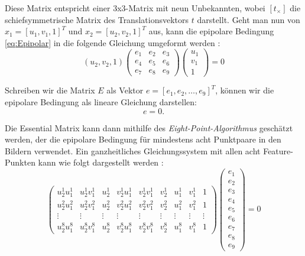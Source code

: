 Diese Matrix entspricht einer 3x3-Matrix mit neun Unbekannten, wobei \( [t_{\times}] \) die schiefsymmetrische Matrix des Translationsvektors \( t \) darstellt. Geht man nun von \( x_1 = [u_1, v_1, 1]^T \) und \( x_2 = [u_2, v_2, 1]^T \) aus, kann die epipolare Bedingung \ref{eq:Epipolar} in die folgende Gleichung umgeformt werden \cite{gao2021vSLAM}:
\begin{equation}
(u_2, v_2, 1) 
\begin{pmatrix}
    e_1 & e_2 & e_3 \\
    e_4 & e_5 & e_6 \\
    e_7 & e_8 & e_9
\end{pmatrix}
\begin{pmatrix}
    u_1 \\ v_1 \\ 1
\end{pmatrix}
= 0
\end{equation}

Schreiben wir die Matrix \( E \) als Vektor \( e = [e_1, e_2, \ldots, e_9]^T \), können wir die epipolare Bedingung als lineare Gleichung darstellen:
\begin{equation}
    [u_2u_1, u_2v_1, u_2, v_2u_1, v_2v_1, v_2, u_1, v_1, 1] e = 0.
\end{equation}

Die Essential Matrix kann dann mithilfe des \emph{Eight-Point-Algorithmus} geschätzt werden, der die epipolare Bedingung für mindestens acht Punktpaare in den Bildern verwendet. Ein ganzheitliches Gleichungssystem mit allen acht Feature-Punkten kann wie folgt dargestellt werden \cite{gao2021vSLAM, stachniss2020FandEmatrix, hartley1997eightpoint}:
\begin{equation}
    \begin{pmatrix}
        u_2^1 u_1^1 & u_2^1 v_1^1 & u_2^1 & v_2^1 u_1^1 & v_2^1 v_1^1 & v_2^1 & u_1^1 & v_1^1 & 1 \\
        u_2^2 u_1^2 & u_2^2 v_1^2 & u_2^2 & v_2^2 u_1^2 & v_2^2 v_1^2 & v_2^2 & u_1^2 & v_1^2 & 1 \\
        \vdots & \vdots & \vdots & \vdots & \vdots & \vdots & \vdots & \vdots & \vdots \\
        u_2^8 u_1^8 & u_2^8 v_1^8 & u_2^8 & v_2^8 u_1^8 & v_2^8 v_1^8 & v_2^8 & u_1^8 & v_1^8 & 1 
    \end{pmatrix}
    \begin{pmatrix}
        e_1 \\ e_2 \\ e_3 \\ e_4 \\ e_5 \\ e_6 \\ e_7 \\ e_8 \\ e_9
    \end{pmatrix}
    = 0
\end{equation}

